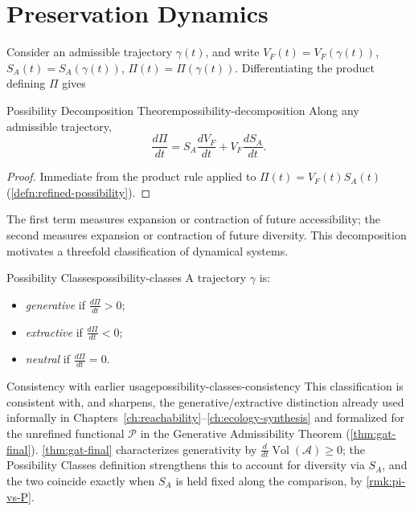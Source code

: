 \documentclass[12pt,twoside,openright]{book}
\newcommand{\adm}{\mathcal{A}}
\newcommand{\Vol}{\operatorname{Vol}}
\begin{document}
\section{Preservation Dynamics}
\label{sec:ch31-dynamics}

Consider an admissible trajectory $\gamma(t)$, and write
$V_F(t) = V_F(\gamma(t))$, $S_A(t) = S_A(\gamma(t))$,
$\Pi(t) = \Pi(\gamma(t))$. Differentiating the product
defining $\Pi$ gives

\begin{theorem}{Possibility Decomposition Theorem}{possibility-decomposition}
  Along any admissible trajectory,
  \[
    \frac{d\Pi}{dt}
    = S_A \frac{dV_F}{dt} + V_F \frac{dS_A}{dt}.
  \]
\end{theorem}

\begin{proof}
  Immediate from the product rule applied to
  $\Pi(t)=V_F(t)S_A(t)$ (\cref{defn:refined-possibility}).
\end{proof}

The first term measures expansion or contraction of future
accessibility; the second measures expansion or contraction
of future diversity. This decomposition motivates a
threefold classification of dynamical systems.

\begin{definition}{Possibility Classes}{possibility-classes}
  A trajectory $\gamma$ is:
  \begin{itemize}
    \item \emph{generative} if $\frac{d\Pi}{dt} > 0$;
    \item \emph{extractive} if $\frac{d\Pi}{dt} < 0$;
    \item \emph{neutral} if $\frac{d\Pi}{dt} = 0$.
  \end{itemize}
\end{definition}

\begin{remark}{Consistency with earlier usage}{possibility-classes-consistency}
  This classification is consistent with, and sharpens, the
  generative/extractive distinction already used informally
  in Chapters~\ref{ch:reachability}--\ref{ch:ecology-synthesis}
  and formalized for the unrefined functional $\mathcal{P}$
  in the Generative Admissibility Theorem
  (\cref{thm:gat-final}). \cref{thm:gat-final} characterizes
  generativity by $\frac{d}{dt}\Vol(\adm)\ge0$; the
  Possibility Classes definition strengthens this to account
  for diversity via $S_A$, and the two coincide exactly when
  $S_A$ is held fixed along the comparison, by
  \cref{rmk:pi-vs-P}.
\end{remark}
\end{document}
